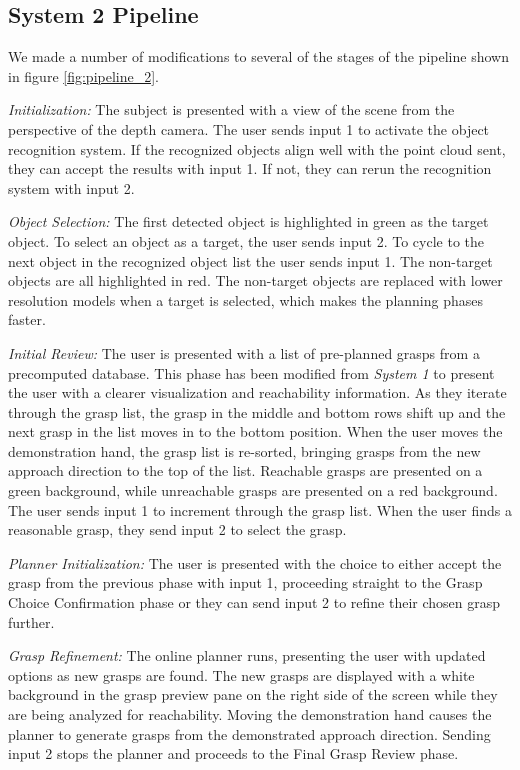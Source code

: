 \subsection{System 2 Pipeline}
\label{section:pipeline-v3}
We made a number of modifications to several of the stages of the pipeline shown in figure \ref{fig:pipeline_2}.

\emph{Initialization:} The subject is presented with a view of the scene from the perspective of the depth camera. The user sends input 1 to activate the object recognition system. If the recognized objects align well with the point cloud sent, they can accept the results with input 1. If not, they can rerun the recognition system with input 2.

\emph{Object Selection:} The first detected object is highlighted in green as the target object. To select an object as a target, the user sends input 2. To cycle to the next object in the recognized object list the user sends input 1. The non-target objects are all highlighted in red. The non-target objects are replaced with lower resolution models when a target is selected, which makes the planning phases faster. 

\emph{Initial Review:} The user is presented with a list of pre-planned grasps from a precomputed database. This phase has been modified from \emph{System 1} to present the user with a clearer visualization and reachability information. As they iterate through the grasp list, the grasp in the middle and bottom rows shift up and the next grasp in the list moves in to the bottom position. When the user moves the demonstration hand, the grasp list is re-sorted, bringing grasps from the new approach direction to the top of the list. Reachable grasps are presented on a green background, while unreachable grasps are presented on a red background. The user sends input 1 to increment through the grasp list. When the user finds a reasonable grasp, they send input 2 to select the grasp.

\emph{Planner Initialization:} The user is presented with the choice to either accept the grasp from the previous phase with input 1, proceeding straight to the Grasp Choice Confirmation phase or they can send input 2 to refine their chosen grasp further.

\emph{Grasp Refinement:} The online planner runs, presenting the user with updated options as new grasps are found. The new grasps are displayed with a white background in the grasp preview pane on the right side of the screen while they are being analyzed for reachability. Moving the demonstration hand causes the planner to generate grasps from the demonstrated approach direction. Sending input 2 stops the planner and proceeds to the Final Grasp Review phase.

